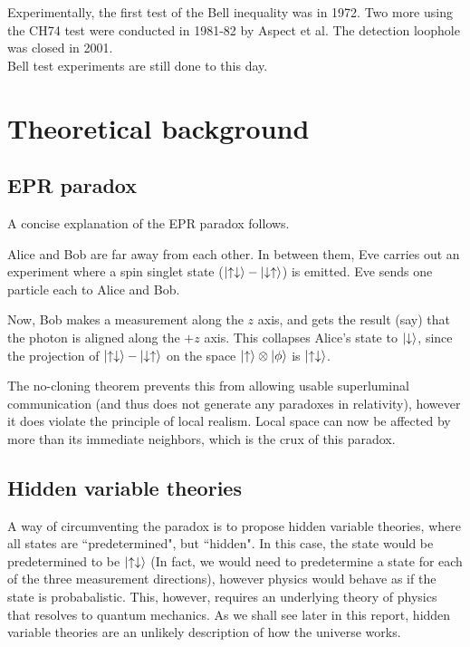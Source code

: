 \documentclass[10pt, twocolumn]{article}
\begin{document}
Experimentally, the first test of the Bell inequality was in 1972\cite{PhysRevLett.28.938}. Two more using the CH74 test were conducted in 1981-82 by Aspect et al\cite{PhysRevLett.47.460}\cite{PhysRevLett.49.1804}. The detection loophole was closed in 2001\cite{rowe2001experimental}.\\

Bell test experiments are still done to this day.

\section{Theoretical background}
\subsection{EPR paradox}
A concise explanation of the EPR paradox follows.

Alice and Bob are far away from each other. In between them, Eve carries out an experiment where a spin singlet state ($\Ket{\uparrow\downarrow}-\Ket{\downarrow\uparrow}$) is emitted. Eve sends one particle each to Alice and Bob.

Now, Bob makes a measurement along the $z$ axis, and gets the result (say) that the photon is aligned along the $+z$ axis. This collapses Alice's state to $\ket{\downarrow}$, since the projection of $\Ket{\uparrow\downarrow}-\Ket{\downarrow\uparrow}$ on the space $\Ket{\uparrow}\otimes\Ket{\phi}$ is $\Ket{\uparrow\downarrow}$.

The no-cloning theorem\cite{wootters1982single} prevents this from allowing usable superluminal communication (and thus does not generate any paradoxes in relativity), however it does violate the principle of local realism. Local space can now be affected by more than its immediate neighbors, which is the crux of this paradox.\\

\subsection{Hidden variable theories}
A way of circumventing the paradox is to propose hidden variable theories, where all states are ``predetermined", but ``hidden". In this case, the state would be predetermined to be $\Ket{\uparrow\downarrow}$ (In fact, we would need to predetermine a state for each of the three measurement directions), however physics would behave as if the state is probabalistic. This, however, requires an underlying theory of physics that resolves to quantum mechanics. As we shall see later in this report, hidden variable theories are an unlikely description of how the universe works.
\end{document}

